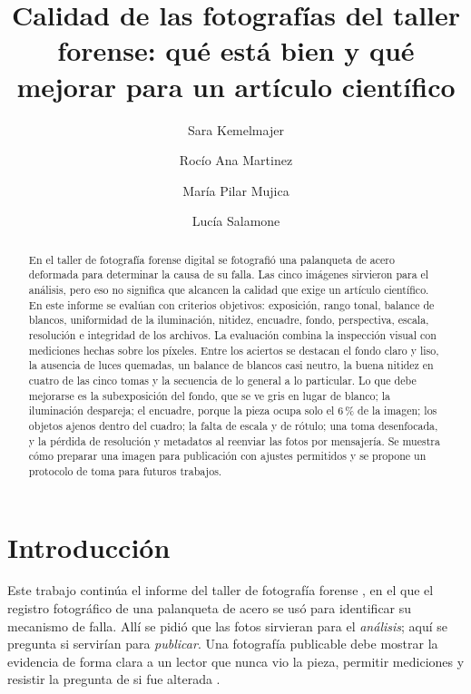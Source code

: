 \documentclass[runningheads]{llncs}
\begin{document}
\title{Calidad de las fotografías del taller forense: qué está bien y qué mejorar para un artículo científico}

\author{Sara Kemelmajer \and Rocío Ana Martinez \and María Pilar Mujica \and Lucía Salamone}


\maketitle

\begin{abstract}
En el taller de fotografía forense digital se fotografió una palanqueta de acero deformada para determinar la causa de su falla. Las cinco imágenes sirvieron para el análisis, pero eso no significa que alcancen la calidad que exige un artículo científico. En este informe se evalúan con criterios objetivos: exposición, rango tonal, balance de blancos, uniformidad de la iluminación, nitidez, encuadre, fondo, perspectiva, escala, resolución e integridad de los archivos. La evaluación combina la inspección visual con mediciones hechas sobre los píxeles. Entre los aciertos se destacan el fondo claro y liso, la ausencia de luces quemadas, un balance de blancos casi neutro, la buena nitidez en cuatro de las cinco tomas y la secuencia de lo general a lo particular. Lo que debe mejorarse es la subexposición del fondo, que se ve gris en lugar de blanco; la iluminación despareja; el encuadre, porque la pieza ocupa solo el 6\,\% de la imagen; los objetos ajenos dentro del cuadro; la falta de escala y de rótulo; una toma desenfocada, y la pérdida de resolución y metadatos al reenviar las fotos por mensajería. Se muestra cómo preparar una imagen para publicación con ajustes permitidos y se propone un protocolo de toma para futuros trabajos.

\end{abstract}

\section{Introducción}

Este trabajo continúa el informe del taller de fotografía forense \cite{forense}, en el que el registro fotográfico de una palanqueta de acero se usó para identificar su mecanismo de falla. Allí se pidió que las fotos sirvieran para el \emph{análisis}; aquí se pregunta si servirían para \emph{publicar}. Una fotografía publicable debe mostrar la evidencia de forma clara a un lector que nunca vio la pieza, permitir mediciones y resistir la pregunta de si fue alterada \cite{astm860,rossner}.
\end{document}
